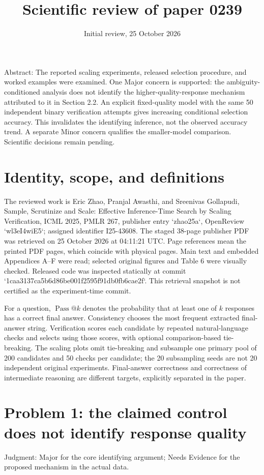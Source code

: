 \documentclass[10pt]{article}
\title{Scientific review of paper 0239}
\author{}
\date{Initial review, 25 October 2026}
\begin{document}
\maketitle
Abstract: The reported scaling experiments, released selection procedure, and worked examples were examined. One Major concern is supported: the ambiguity-conditioned analysis does not identify the higher-quality-response mechanism attributed to it in Section 2.2. An explicit fixed-quality model with the same 50 independent binary verification attempts gives increasing conditional selection accuracy. This invalidates the identifying inference, not the observed accuracy trend. A separate Minor concern qualifies the smaller-model comparison. Scientific decisions remain pending.\par
\section*{Identity, scope, and definitions}
The reviewed work is Eric Zhao, Pranjal Awasthi, and Sreenivas Gollapudi, Sample, Scrutinize and Scale: Effective Inference-Time Search by Scaling Verification, ICML 2025, PMLR 267, publisher entry `zhao25a`, OpenReview `wl3eI4wiE5`; assigned identifier I25-43608. The staged 38-page publisher PDF was retrieved on 25 October 2026 at 04:11:21 UTC. Page references mean the printed PDF pages, which coincide with physical pages. Main text and embedded Appendices A–F were read; selected original figures and Table 6 were visually checked. Released code was inspected statically at commit `1caa3137ca5b6d86be001f2595f91db0fb6cae2f`. This retrieval snapshot is not certified as the experiment-time commit.\par
For a question, \(\operatorname{Pass}@k\) denotes the probability that at least one of \(k\) responses has a correct final answer. Consistency chooses the most frequent extracted final-answer string. Verification scores each candidate by repeated natural-language checks and selects using those scores, with optional comparison-based tie-breaking. The scaling plots omit tie-breaking and subsample one primary pool of 200 candidates and 50 checks per candidate; the 20 subsampling seeds are not 20 independent original experiments. Final-answer correctness and correctness of intermediate reasoning are different targets, explicitly separated in the paper.\par
\section*{Problem 1: the claimed control does not identify response quality}
Judgment: Major for the core identifying argument; Needs Evidence for the proposed mechanism in the actual data.\par
\end{document}
